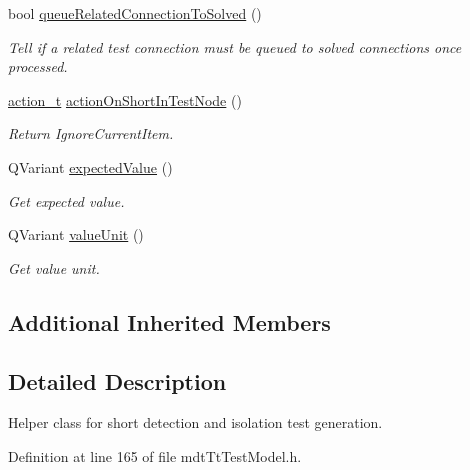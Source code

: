 \begin{DoxyCompactItemize}
bool \hyperlink{classmdt_tt_test_model_isolation_test_generator_helper_ab473020de47d8114ec6f71c17bde5dc2}{queue\-Related\-Connection\-To\-Solved} ()
\begin{DoxyCompactList}\small\item\em Tell if a related test connection must be queued to solved connections once processed. \end{DoxyCompactList}\item 
\hyperlink{classmdt_tt_test_model_abstract_generator_helper_abc4f8e08285031633b19282d517cc0b5}{action\-\_\-t} \hyperlink{classmdt_tt_test_model_isolation_test_generator_helper_a1f0f50ed4e3b07bb04cdf18786606cfd}{action\-On\-Short\-In\-Test\-Node} ()
\begin{DoxyCompactList}\small\item\em Return Ignore\-Current\-Item. \end{DoxyCompactList}\item 
Q\-Variant \hyperlink{classmdt_tt_test_model_isolation_test_generator_helper_ad7b43182d7825048efb2b6fcd18c6803}{expected\-Value} ()
\begin{DoxyCompactList}\small\item\em Get expected value. \end{DoxyCompactList}\item 
Q\-Variant \hyperlink{classmdt_tt_test_model_isolation_test_generator_helper_a7d55e02fef9b1714da4f272c4dd11d3c}{value\-Unit} ()
\begin{DoxyCompactList}\small\item\em Get value unit. \end{DoxyCompactList}\end{DoxyCompactItemize}
\subsection*{Additional Inherited Members}


\subsection{Detailed Description}
Helper class for short detection and isolation test generation. 

Definition at line 165 of file mdt\-Tt\-Test\-Model.\-h.



